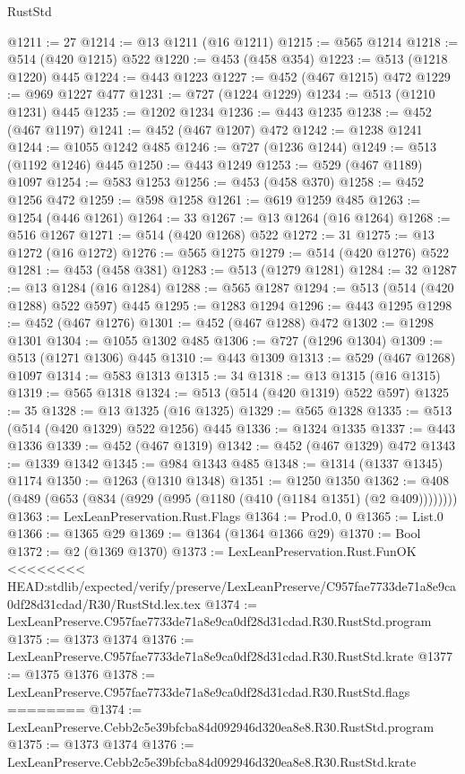 \begin{lexlean}{RustStd}
\begin{coremodule}
{\begin{coremodule}
{{{{{{{{{{{@1211 := 27
@1214 := @13 @1211 (@16 @1211)
@1215 := @565 @1214
@1218 := @514 (@420 @1215) @522
@1220 := @453 (@458 @354)
@1223 := @513 (@1218 @1220) @445
@1224 := @443 @1223
@1227 := @452 (@467 @1215) @472
@1229 := @969 @1227 @477
@1231 := @727 (@1224 @1229)
@1234 := @513 (@1210 @1231) @445
@1235 := @1202 @1234
@1236 := @443 @1235
@1238 := @452 (@467 @1197)
@1241 := @452 (@467 @1207) @472
@1242 := @1238 @1241
@1244 := @1055 @1242 @485
@1246 := @727 (@1236 @1244)
@1249 := @513 (@1192 @1246) @445
@1250 := @443 @1249
@1253 := @529 (@467 @1189) @1097
@1254 := @583 @1253
@1256 := @453 (@458 @370)
@1258 := @452 @1256 @472
@1259 := @598 @1258
@1261 := @619 @1259 @485
@1263 := @1254 (@446 @1261)
@1264 := 33
@1267 := @13 @1264 (@16 @1264)
@1268 := @516 @1267
@1271 := @514 (@420 @1268) @522
@1272 := 31
@1275 := @13 @1272 (@16 @1272)
@1276 := @565 @1275
@1279 := @514 (@420 @1276) @522
@1281 := @453 (@458 @381)
@1283 := @513 (@1279 @1281)
@1284 := 32
@1287 := @13 @1284 (@16 @1284)
@1288 := @565 @1287
@1294 := @513 (@514 (@420 @1288) @522 @597) @445
@1295 := @1283 @1294
@1296 := @443 @1295
@1298 := @452 (@467 @1276)
@1301 := @452 (@467 @1288) @472
@1302 := @1298 @1301
@1304 := @1055 @1302 @485
@1306 := @727 (@1296 @1304)
@1309 := @513 (@1271 @1306) @445
@1310 := @443 @1309
@1313 := @529 (@467 @1268) @1097
@1314 := @583 @1313
@1315 := 34
@1318 := @13 @1315 (@16 @1315)
@1319 := @565 @1318
@1324 := @513 (@514 (@420 @1319) @522 @597)
@1325 := 35
@1328 := @13 @1325 (@16 @1325)
@1329 := @565 @1328
@1335 := @513 (@514 (@420 @1329) @522 @1256) @445
@1336 := @1324 @1335
@1337 := @443 @1336
@1339 := @452 (@467 @1319)
@1342 := @452 (@467 @1329) @472
@1343 := @1339 @1342
@1345 := @984 @1343 @485
@1348 := @1314 (@1337 @1345) @1174
@1350 := @1263 (@1310 @1348)
@1351 := @1250 @1350
@1362 := @408 (@489 (@653 (@834 (@929 (@995 (@1180 (@410 (@1184 @1351) (@2 @409))))))))
@1363 := LexLeanPreservation.Rust.Flags
@1364 := Prod.{0, 0}
@1365 := List.{0}
@1366 := @1365 @29
@1369 := @1364 (@1364 @1366 @29)
@1370 := Bool
@1372 := @2 (@1369 @1370)
@1373 := LexLeanPreservation.Rust.FunOK
<<<<<<<< HEAD:stdlib/expected/verify/preserve/LexLeanPreserve/C957fae7733de71a8e9ca0df28d31cdad/R30/RustStd.lex.tex
@1374 := LexLeanPreserve.C957fae7733de71a8e9ca0df28d31cdad.R30.RustStd.program
@1375 := @1373 @1374
@1376 := LexLeanPreserve.C957fae7733de71a8e9ca0df28d31cdad.R30.RustStd.krate
@1377 := @1375 @1376
@1378 := LexLeanPreserve.C957fae7733de71a8e9ca0df28d31cdad.R30.RustStd.flags
========
@1374 := LexLeanPreserve.Cebb2c5e39bfcba84d092946d320ea8e8.R30.RustStd.program
@1375 := @1373 @1374
@1376 := LexLeanPreserve.Cebb2c5e39bfcba84d092946d320ea8e8.R30.RustStd.krate
}}}}}}}}}}}
\end{coremodule}}
\end{coremodule}
\end{lexlean}
